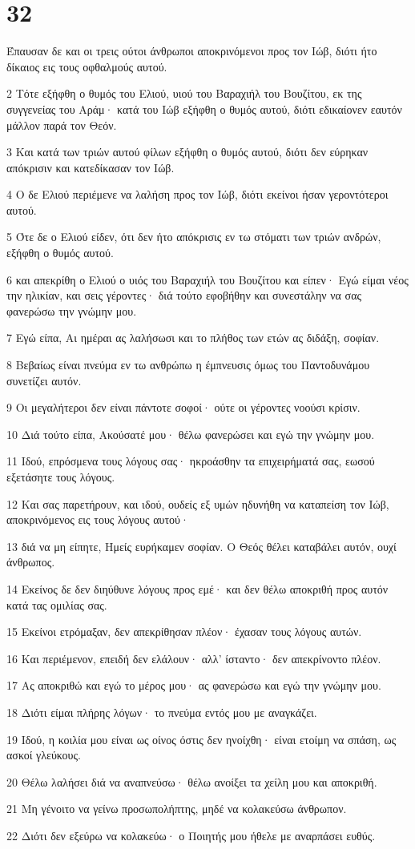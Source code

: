 \chapter{32}

\par Έπαυσαν δε και οι τρεις ούτοι άνθρωποι αποκρινόμενοι προς τον Ιώβ, διότι ήτο δίκαιος εις τους οφθαλμούς αυτού.
\par 2 Τότε εξήφθη ο θυμός του Ελιού, υιού του Βαραχιήλ του Βουζίτου, εκ της συγγενείας του Αράμ· κατά του Ιώβ εξήφθη ο θυμός αυτού, διότι εδικαίονεν εαυτόν μάλλον παρά τον Θεόν.
\par 3 Και κατά των τριών αυτού φίλων εξήφθη ο θυμός αυτού, διότι δεν εύρηκαν απόκρισιν και κατεδίκασαν τον Ιώβ.
\par 4 Ο δε Ελιού περιέμενε να λαλήση προς τον Ιώβ, διότι εκείνοι ήσαν γεροντότεροι αυτού.
\par 5 Ότε δε ο Ελιού είδεν, ότι δεν ήτο απόκρισις εν τω στόματι των τριών ανδρών, εξήφθη ο θυμός αυτού.
\par 6 και απεκρίθη ο Ελιού ο υιός του Βαραχιήλ του Βουζίτου και είπεν· Εγώ είμαι νέος την ηλικίαν, και σεις γέροντες· διά τούτο εφοβήθην και συνεστάλην να σας φανερώσω την γνώμην μου.
\par 7 Εγώ είπα, Αι ημέραι ας λαλήσωσι και το πλήθος των ετών ας διδάξη, σοφίαν.
\par 8 Βεβαίως είναι πνεύμα εν τω ανθρώπω η έμπνευσις όμως του Παντοδυνάμου συνετίζει αυτόν.
\par 9 Οι μεγαλήτεροι δεν είναι πάντοτε σοφοί· ούτε οι γέροντες νοούσι κρίσιν.
\par 10 Διά τούτο είπα, Ακούσατέ μου· θέλω φανερώσει και εγώ την γνώμην μου.
\par 11 Ιδού, επρόσμενα τους λόγους σας· ηκροάσθην τα επιχειρήματά σας, εωσού εξετάσητε τους λόγους.
\par 12 Και σας παρετήρουν, και ιδού, ουδείς εξ υμών ηδυνήθη να καταπείση τον Ιώβ, αποκρινόμενος εις τους λόγους αυτού·
\par 13 διά να μη είπητε, Ημείς ευρήκαμεν σοφίαν. Ο Θεός θέλει καταβάλει αυτόν, ουχί άνθρωπος.
\par 14 Εκείνος δε δεν διηύθυνε λόγους προς εμέ· και δεν θέλω αποκριθή προς αυτόν κατά τας ομιλίας σας.
\par 15 Εκείνοι ετρόμαξαν, δεν απεκρίθησαν πλέον· έχασαν τους λόγους αυτών.
\par 16 Και περιέμενον, επειδή δεν ελάλουν· αλλ' ίσταντο· δεν απεκρίνοντο πλέον.
\par 17 Ας αποκριθώ και εγώ το μέρος μου· ας φανερώσω και εγώ την γνώμην μου.
\par 18 Διότι είμαι πλήρης λόγων· το πνεύμα εντός μου με αναγκάζει.
\par 19 Ιδού, η κοιλία μου είναι ως οίνος όστις δεν ηνοίχθη· είναι ετοίμη να σπάση, ως ασκοί γλεύκους.
\par 20 Θέλω λαλήσει διά να αναπνεύσω· θέλω ανοίξει τα χείλη μου και αποκριθή.
\par 21 Μη γένοιτο να γείνω προσωπολήπτης, μηδέ να κολακεύσω άνθρωπον.
\par 22 Διότι δεν εξεύρω να κολακεύω· ο Ποιητής μου ήθελε με αναρπάσει ευθύς.

